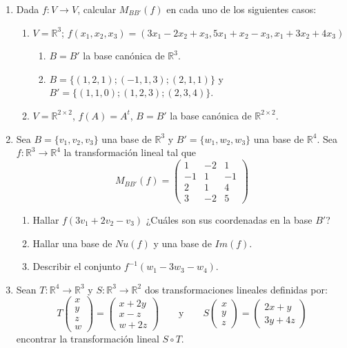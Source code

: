 \documentclass[12pt,letterpaper]{article}
\begin{document}
\begin{enumerate}
  \item Dada $f : V \to V$, calcular $M_{BB'}(f)$ en cada uno de los siguientes casos:
  \begin{enumerate}
    \item $V = \mathbb{R}^3$; $f(x_1, x_2, x_3) = (3x_1 - 2x_2 + x_3, 5x_1 + x_2 - x_3, x_1 + 3x_2 + 4x_3)$
    \begin{enumerate}
      \item $B = B'$ la base canónica de $\mathbb{R}^3$.
      \item $B = \{(1, 2, 1); (-1, 1, 3); (2, 1, 1)\}$ y $B' = \{(1, 1, 0); (1, 2, 3); (2, 3, 4)\}$.
    \end{enumerate}
    \item $V = \mathbb{R}^{2\times2}$, $f(A) = A^t$, $B = B'$ la base canónica de $\mathbb{R}^{2\times2}$.
  \end{enumerate}
  \item Sea $B = \{v_1, v_2, v_3\}$ una base de $\mathbb{R}^3$ y $B' = \{w_1, w_2, w_3\}$ una base de $\mathbb{R}^4$. Sea $f : \mathbb{R}^3\to\mathbb{R}^4$ la transformación lineal tal que
  $$
  M_{BB'}(f) = \begin{pmatrix}
    1 & -2 & 1\\
    -1 & 1 & -1\\
    2 & 1 & 4\\
    3 & -2 & 5
  \end{pmatrix}
  $$
  \begin{enumerate}
    \item Hallar $f(3v_1 + 2v_2 - v_3)$ ¿Cuáles son sus coordenadas en la base $B'$?
    \item Hallar una base de $Nu(f)$ y una base de $Im(f)$.
    \item Describir el conjunto $f^{-1}(w_1 - 3w_3 - w_4)$.
  \end{enumerate}
  \item Sean $T: \mathbb{R}^4\to\mathbb{R}^3$ y $S: \mathbb{R}^3\to\mathbb{R}^2$ dos transformaciones lineales definidas por:
  $$
  T\begin{pmatrix}
    x\\
    y\\
    z\\
    w
  \end{pmatrix}=\begin{pmatrix}
    x+2y\\
    x-z\\
    w+2z
    \end{pmatrix}\qquad\text{y}\qquad S\begin{pmatrix}
    x\\
    y\\
    z
  \end{pmatrix}=\begin{pmatrix}
    2x+y\\
    3y+4z
  \end{pmatrix}
  $$
  encontrar la transformación lineal $S \circ T$.
\end{enumerate}
\end{document}
